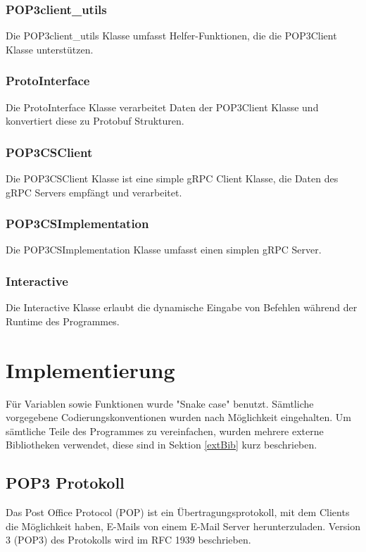 \documentclass[12pt, letterpaper]{article}
\begin{document}
\subsubsection{POP3client\_utils}
Die POP3client\_utils Klasse umfasst Helfer-Funktionen, die die POP3Client Klasse unterstützen.

\subsubsection{ProtoInterface}
Die ProtoInterface Klasse verarbeitet Daten der POP3Client Klasse und konvertiert diese zu Protobuf Strukturen.

\subsubsection{POP3CSClient}
Die POP3CSClient Klasse ist eine simple gRPC Client Klasse, die Daten des gRPC Servers empfängt und verarbeitet.

\subsubsection{POP3CSImplementation}
Die POP3CSImplementation Klasse umfasst einen simplen gRPC Server.

\subsubsection{Interactive}
Die Interactive Klasse erlaubt die dynamische Eingabe von Befehlen während der Runtime des Programmes. 

\section{Implementierung}
Für Variablen sowie Funktionen wurde "Snake case" benutzt. Sämtliche vorgegebene Codierungskonventionen wurden nach Möglichkeit eingehalten. Um sämtliche Teile des Programmes zu vereinfachen, wurden mehrere externe Bibliotheken verwendet, diese sind in Sektion \ref{extBib} kurz beschrieben. 

\subsection{POP3 Protokoll}
Das Post Office Protocol (POP) ist ein Übertragungsprotokoll, mit dem Clients die Möglichkeit haben, E-Mails von einem E-Mail Server herunterzuladen. Version 3 (POP3) des Protokolls wird im RFC 1939\cite{rfc1939} beschrieben. 
\end{document}
